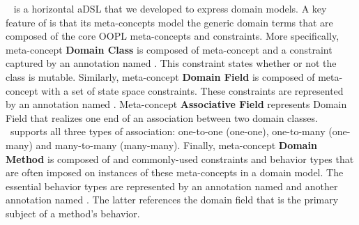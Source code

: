 ~\cite{le_domain_2018} is a horizontal aDSL that we developed to express domain models.
A key feature of  is that its meta-concepts model the generic domain terms that are composed of the core OOPL meta-concepts and constraints. More specifically, meta-concept \textbf{Domain Class} is composed of meta-concept  and a constraint captured by an annotation named . This constraint states whether or not the class is mutable. Similarly, meta-concept \textbf{Domain Field} is composed of meta-concept  with a set of state space constraints. 
These constraints are represented by an annotation named . 
Meta-concept \textbf{Associative Field} represents Domain Field that realizes one end of an association between two domain classes. \dcsl~supports all three types of association: one-to-one (\abbr one-one), one-to-many (\abbr one-many) and many-to-many (\abbr many-many). 
Finally, meta-concept \textbf{Domain Method} is composed of  and commonly-used constraints and behavior types that are often imposed on instances of these meta-concepts in a domain model. The essential behavior types are represented by an annotation named  and another annotation named . The latter references the domain field that is the primary subject of a method's behavior.



